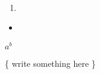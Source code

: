 
\\

\begin{enumerate}
    \item{}
\end{enumerate}

\begin{itemize}
    \item{}
\end{itemize}

\( a^b \)

\{ write something here \}